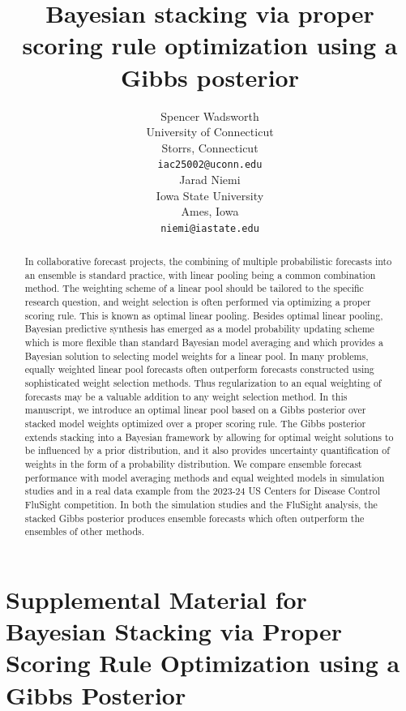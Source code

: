 \documentclass{article}
\title{Bayesian stacking via proper scoring rule optimization using a Gibbs posterior}
\author{Spencer Wadsworth \\
	University of Connecticut\\
	Storrs, Connecticut\\
	\texttt{iac25002@uconn.edu} \\
	\And
	Jarad Niemi \\
	Iowa State University\\
	Ames, Iowa\\
	\texttt{niemi@iastate.edu} \\
}
\date{}
\newcommand{\1}[1]{\mathds{1}\left[#1\right]}
\begin{document}
\maketitle
% 
\begin{abstract}
In collaborative forecast projects, the combining of multiple probabilistic 
forecasts into an ensemble is standard practice, with linear pooling
being a common combination method.
The weighting scheme of a linear pool should be 
tailored to the specific research question, and weight selection is often 
performed via optimizing a proper scoring rule. This is known as optimal
linear pooling.
Besides optimal linear pooling, Bayesian predictive synthesis has 
emerged as a model probability updating scheme which is more flexible than
standard Bayesian model averaging and which provides a Bayesian 
solution to selecting model weights for a linear pool.
In many problems, equally weighted linear pool forecasts often 
outperform forecasts constructed using sophisticated weight selection methods.
Thus regularization to an equal weighting of forecasts may be a valuable 
addition to any weight selection method.
In this manuscript, we introduce an optimal linear pool
based on a Gibbs posterior over stacked model weights optimized
over a proper scoring rule. The Gibbs posterior extends stacking 
into a Bayesian framework by allowing for optimal weight solutions to be 
influenced by a prior distribution, and it also provides uncertainty 
quantification of weights in the form of a probability distribution. 
We compare ensemble forecast performance with model averaging methods and equal 
weighted models in simulation studies and in a real data example from the 
2023-24 US Centers for Disease Control FluSight competition. In both the 
simulation studies and the FluSight analysis, the stacked Gibbs posterior 
produces ensemble forecasts which often outperform the ensembles of other 
methods.
\end{abstract}
% 
% 


\section*{Supplemental Material for Bayesian Stacking via Proper Scoring Rule
Optimization using a Gibbs Posterior}

\end{document}
